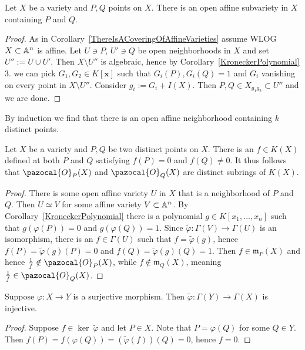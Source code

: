     \begin{lemma}
        Let $X$ be a variety and $P,Q$ points on $X$. There is an open affine subvariety in $X$ containing $P$ and $Q$.
    \end{lemma}
    \begin{proof}
        As in Corollary~\ref{ThereIsACoveringOfAffineVarieties} assume WLOG $X\subset\mathbb{A}^n$ is affine. Let $U\ni P$, $U'\ni Q$ be open neighborhoods in $X$ and set $U'':= U\cup U'$. Then $X\setminus U''$ is algebraic, hence by Corollary~\ref{KroneckerPolynomial} 3. we can pick $G_1,G_2\in K[\mathbf{x}]$ such that $G_i(P),G_i(Q)= 1$ and $G_i$ vanishing on every point in $X\setminus U''$. Consider $g_i := G_i + I(X)$. Then $P,Q\in X_{g_1g_2} \subset U''$ and we are done.   
    \end{proof}
    \begin{remark}
        By induction we find that there is an open affine neighborhood containing $k$ distinct points. 
    \end{remark}
    \begin{lemma}
        Let $X$ be a variety and $P,Q$ be two distinct points on $X$. There is an $f\in K(X)$ defined at both $P$ and $Q$ satisfying $f(P)=0$ and $f(Q)\neq 0$. It thus follows that $\pazocal{O}_P(X)$ and $\pazocal{O}_Q(X)$ are distinct subrings of $K(X)$.
    \end{lemma}
    \begin{proof}
        There is some open affine variety $U$ in $X$ that is a neighborhood of $P$ and $Q$. Then $U\simeq V$ for some affine variety $V\subset \mathbb{A}^n$. By Corollary~\ref{KroneckerPolynomial} there is a polynomial $g\in K[x_1,\dots,x_n]$ such that $g(\varphi(P))=0$ and $g(\varphi(Q))=1$. Since $\widetilde{\varphi}: \Gamma(V)\rightarrow \Gamma(U)$ is an isomorphism, there is an $f\in \Gamma(U)$ such that $f=\widetilde{\varphi}(g)$, hence $f(P)=\widetilde{\varphi}(g)(P)=0$ and $f(Q)=\widetilde{\varphi}(g)(Q)=1$. Then $f\in \mathfrak{m}_P(X)$ and hence $\frac{1}{f}\notin \pazocal{O}_P(X)$, while $f\notin \mathfrak{m}_Q(X)$, meaning $\frac{1}{f}\in \pazocal{O}_Q(X)$. 
    \end{proof}
    \begin{lemma}
        Suppose $\varphi: X\rightarrow Y$ is a surjective morphism. Then $\widetilde{\varphi}: \Gamma(Y)\rightarrow \Gamma(X)$ is injective. 
    \end{lemma}
    \begin{proof}
        Suppose $f\in \ker\ \widetilde{\varphi}$ and let $P\in X$. Note that $P=\varphi(Q)$ for some $Q\in Y$. Then $f(P)=f(\varphi(Q))=(\widetilde{\varphi}(f))(Q)=0$, hence $f=0$.
    \end{proof}
